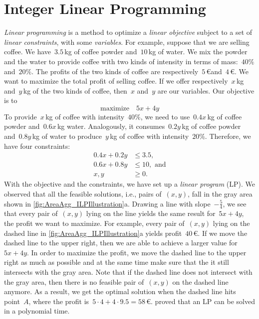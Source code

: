 \documentclass[acmsmall,natbib=false]{acmart}
\begin{document}
\section{Integer Linear Programming}
\label{sec:AreaAgg_ILP}

\emph{Linear programming} is a method 
to optimize a \emph{linear objective}
subject to a set of \emph{linear constraints},
with some \emph{variables}.
For example, suppose that we are selling coffee.
We have~$3.5\,$kg of coffee powder and~$10\,$kg of water.
We mix the powder and the water to provide coffee with 
two kinds of intensity in terms of mass:~$40\%$ and~$20\%$.
The profits of the two kinds of coffee 
are respectively~$5\,$\euro and~$4\,$\euro.
We want to maximize the total profit of selling coffee.
If we offer respectively~$x\,$kg and~$y\,$kg 
of the two kinds of coffee,
then~$x$ and~$y$ are our variables.
Our objective is to
$$
\mathrm{maximize} 	\quad	 5x+4y
$$
To provide~$x\,$kg of coffee with intensity~$40\%$,
we need to use~$0.4x\,$kg of coffee powder 
and~$0.6x\,$kg water.
Analogously, it consumes~$0.2y\,$kg of coffee powder 
and~$0.8y\,$kg of water to produce~$y\,$kg of coffee
with intensity~$20\%$.
Therefore, we have four constraints:
\begin{align*}
0.4x+0.2y	&\le 3.5,				\\
0.6x+0.8y 	&\le 10,	\text{~and}			\\
x,y			&\ge 0.
\end{align*}
With the objective and the constraints, 
we have set up a \emph{linear program} (LP).
We observed that 
all the feasible solutions, i.e., pairs of~$(x,y)$,
fall in the gray area 
shown in \fig\ref{fig:AreaAgg_ILPIllustration}a.
Drawing a line with slope~$-\frac{5}{4}$,
we see that every pair of~$(x,y)$ lying on the line
yields the same result for~$5x+4y$, 
the profit we want to maximize.
For example, every pair of~$(x,y)$ lying on the dashed line
in \fig\ref{fig:AreaAgg_ILPIllustration}a 
yields profit~$40\,$\euro.
If we move the dashed line to the upper right,
then we are able to achieve a larger value for~$5x+4y$. 
In order to maximize the profit, 
we move the dashed line to the upper right as much as possible
and at the same time make sure that 
the it still intersects with the gray area.
Note that if the dashed line 
does not intersect with the gray area,
then there is no feasible pair of~$(x,y)$ 
on the dashed line anymore.
As a result, we get the optimal solution 
when the dashed line hits point~$A$,
where the profit is~$5 \cdot 4 + 4 \cdot 9.5 =58\,$\euro.
\textcite{Karmarkar1984LP}
proved that an LP can be solved in a polynomial time.
\end{document}
